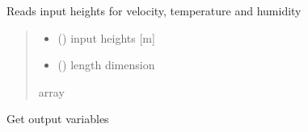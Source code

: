\documentclass[letterpaper,10pt,english]{sphinxmanual}
\begin{document}
\begin{fulllineitems}
\label{\detokenize{users_guide:AirSeaFluxCode.util_subs.get_heights}}
\pysigstartsignatures
\pysiglinewithargsret
{}
{\sphinxparamcomma {}}
{}
\pysigstopsignatures
\sphinxAtStartPar
Reads input heights for velocity, temperature and humidity
\begin{quote}\begin{description}
\begin{itemize}
\item {}
\sphinxAtStartPar
{} () \textendash{} input heights {[}m{]}

\item {}
\sphinxAtStartPar
{} () \textendash{} length dimension

\end{itemize}

\sphinxAtStartPar
{}

\sphinxAtStartPar
array

\end{description}\end{quote}

\end{fulllineitems}


\begin{fulllineitems}
\label{\detokenize{users_guide:AirSeaFluxCode.util_subs.get_outvars}}
\pysigstartsignatures
\pysiglinewithargsret
{}
{\sphinxparamcomma {}\sphinxparamcomma {}}
{}
\pysigstopsignatures
\sphinxAtStartPar
Get output variables
\begin{quote}\begin{description}
\sphinxAtStartPar
{}

\end{description}\end{quote}

\end{fulllineitems}
\end{document}
